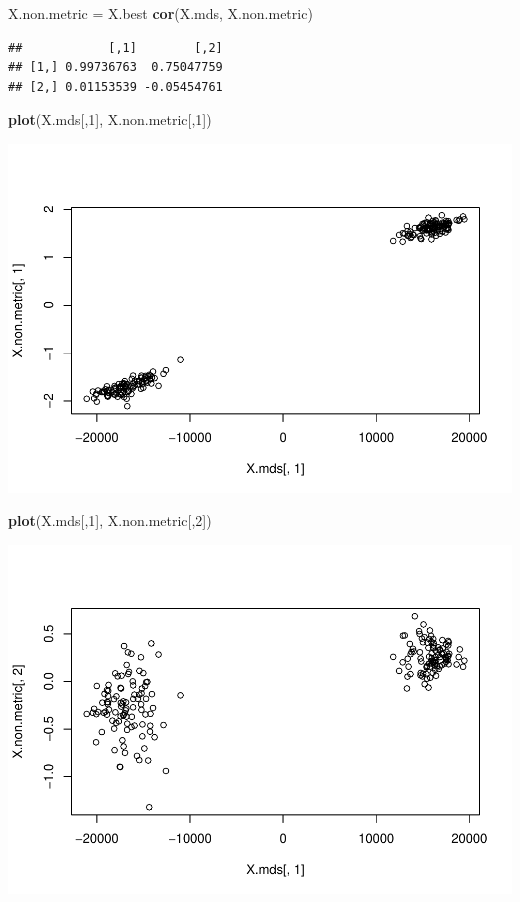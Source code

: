 \documentclass[
]{article}
\newenvironment{Shaded}{\begin{snugshade}}{\end{snugshade}}
\newcommand{\DecValTok}[1]{\textcolor[rgb]{0.00,0.00,0.81}{#1}}
\newcommand{\KeywordTok}[1]{\textcolor[rgb]{0.13,0.29,0.53}{\textbf{#1}}}
\newcommand{\NormalTok}[1]{#1}
\newcommand{\StringTok}[1]{\textcolor[rgb]{0.31,0.60,0.02}{#1}}
\begin{document}
\begin{Shaded}
\begin{Highlighting}[]
\NormalTok{X.non.metric =}\StringTok{ }\NormalTok{X.best }
\KeywordTok{cor}\NormalTok{(X.mds, X.non.metric)}
\end{Highlighting}
\end{Shaded}

\begin{verbatim}
##            [,1]        [,2]
## [1,] 0.99736763  0.75047759
## [2,] 0.01153539 -0.05454761
\end{verbatim}

\begin{Shaded}
\begin{Highlighting}[]
\KeywordTok{plot}\NormalTok{(X.mds[,}\DecValTok{1}\NormalTok{], X.non.metric[,}\DecValTok{1}\NormalTok{])}
\end{Highlighting}
\end{Shaded}

\includegraphics{P052020_Substructure_files/figure-latex/13th-1.pdf}

\begin{Shaded}
\begin{Highlighting}[]
\KeywordTok{plot}\NormalTok{(X.mds[,}\DecValTok{1}\NormalTok{], X.non.metric[,}\DecValTok{2}\NormalTok{])}
\end{Highlighting}
\end{Shaded}

\includegraphics{P052020_Substructure_files/figure-latex/13th-2.pdf}
\end{document}

